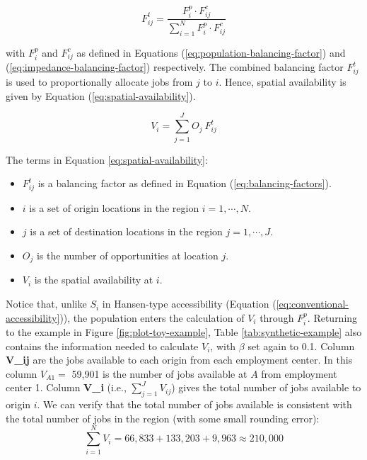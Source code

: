 \documentclass[10pt,letterpaper]{article}
\providecommand{\tightlist}{%
  \setlength{\itemsep}{0pt}\setlength{\parskip}{0pt}}
\begin{document}
\begin{equation}
\label{eq:balancing-factors}
F^t_{ij} = \frac{F^p_{i} \cdot F^c_{ij}}{\sum_{i=1}^N F^p_{i} \cdot F^c_{ij}}
\end{equation}

\noindent with \(F^p_{i}\) and \(F^c_{ij}\) as defined in Equations
(\ref{eq:population-balancing-factor}) and
(\ref{eq:impedance-balancing-factor}) respectively. The combined
balancing factor \(F^t_{ij}\) is used to proportionally allocate jobs
from \(j\) to \(i\). Hence, spatial availability is given by Equation
(\ref{eq:spatial-availability}).

\begin{equation}
\label{eq:spatial-availability}
V_{i} = \sum_{j=1}^J O_j\ F^t_{ij}
\end{equation}

The terms in Equation \ref{eq:spatial-availability}:

\begin{itemize}
\tightlist
\item
  \(F^t_{ij}\) is a balancing factor as defined in Equation
  (\ref{eq:balancing-factors}).
\item
  \(i\) is a set of origin locations in the region \(i = 1,\cdots, N\).
\item
  \(j\) is a set of destination locations in the region
  \(j = 1,\cdots,J\).
\item
  \(O_j\) is the number of opportunities at location \(j\).
\item
  \(V_{i}\) is the spatial availability at \(i\).
\end{itemize}

Notice that, unlike \(S_i\) in Hansen-type accessibility (Equation
(\ref{eq:conventional-accessibility})), the population enters the
calculation of \(V_{i}\) through \(F^p_i\). Returning to the example in
Figure \ref{fig:plot-toy-example}, Table \ref{tab:synthetic-example}
also contains the information needed to calculate \(V_i\), with
\(\beta\) set again to 0.1. Column \textbf{V\_ij} are the jobs available
to each origin from each employment center. In this column \(V_{A1}=\)
59,901 is the number of jobs available at \(A\) from employment center
1. Column \textbf{V\_i} (i.e., \(\sum_{j=1}^JV_{ij}\)) gives the total
number of jobs available to origin \(i\). We can verify that the total
number of jobs available is consistent with the total number of jobs in
the region (with some small rounding error): \[
\sum_{i=1}^N V_i = 66,833 + 133,203 + 9,963 \approx 210,000 
\]
\end{document}
